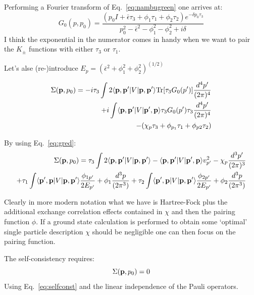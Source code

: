 Performing a Fourier transform of  Eq.~\ref{eq:nambugreen} one arrives at:
%
\begin{equation}
G_{0}(p,p_{0}) = \frac{(p_{0}I + \bar{\epsilon}\tau_{3} + \phi_{1}\tau_{1} + \phi_{2}\tau_{2}) e^{-\delta p_{0}\tau_{3}}}
{p_{0}^{2} - \bar{\epsilon}^{2} -\phi_{1}^{2} - \phi_{2}^{2} + i\delta}
\end{equation}
%
I think the exponential in the numerator comes in handy when we want to pair the $K_{\pm}$ 
functions with either $\tau_{3}$ or $\tau_{1}$.

Let's alse (re-)introduce $E_{p} = (\bar{\epsilon}^{2} + \phi_{1}^{2} + \phi_{2}^{2})^{(1/2)}$

%
\begin{align}
\Sigma({\bf p}, p_{0}) =  -i\tau_{3}\int 2\langle {\bf p}, {\bf p}' | V | {\bf p},{\bf p}' \rangle {\rm Tr}[\tau_{3} G_{0}(p')] \frac{d^{4}p'}{(2\pi)^{4}} \\
   + i \int \langle {\bf p}, {\bf p}' | V | {\bf p}', {\bf p} \rangle \tau_{3}G_{0}(p') \tau_{3} \frac{d^{4}p'}{(2\pi)^{4}}  \\
   -(\chi_{p} \tau_{3} +\phi_{p_{1}}\tau_{1} + \phi_{p2}\tau_{2})
\end{align}
%

By using Eq.~\ref{eq:gred}:
%
\begin{align}
\Sigma({\bf p}, p_{0}) =  \tau_{3}\int 2\langle{\bf p},{\bf p}'|V|{\bf p},{\bf p}'\rangle - \langle{\bf p},{\bf p}'|V|{\bf p}',{\bf p}\rangle v^{2}_{p'} - \chi_{p} \frac{d^{3}p'}{(2\pi)^{3}}\\
							    + \tau_{1} \int \langle{\bf p}',{\bf p}|V|{\bf p},{\bf p}'\rangle \frac{\phi_{1p'}}{2E_{p'}} + \phi_{1}  \frac{d^{3}p}{(2\pi^{3})}
							    + \tau_{2} \int \langle{\bf p}',{\bf p}|V|{\bf p},{\bf p}'\rangle \frac{\phi_{2p'}}{2E_{p'}} + \phi_{2}  \frac{d^{3}p}{(2\pi^{3})}
\end{align}

Clearly in more modern notation what we have is Hartree-Fock plus the additional 
exchange correlation effects contained in $\chi$ and then the pairing function $\phi$.
If a ground state calculation is performed to obtain some `optimal' single particle
description $\chi$ should be negligible one can then focus on the pairing function.

The self-consistency requires:
%
\begin{equation}
\label{eq:selfconst}
\Sigma({\bf p},p_{0}) = 0
\end{equation}
%
Using Eq.~\ref{eq:selfconst} and the linear independence of the Pauli operators.

